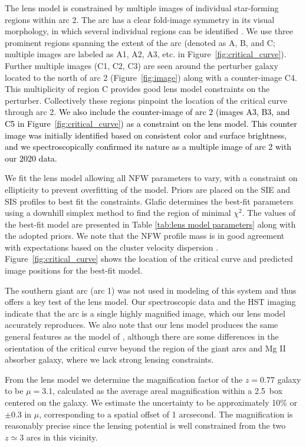 \documentclass[twocolumn]{aastex62}
\newcommand{\MgII}{Mg\tiny{ }\footnotesize{II}\normalsize{ }}
\newcommand{\comment}[1]{\textcolor{black}{#1}}
\begin{document}
The lens model is constrained by multiple images of individual star-forming regions within arc 2. The arc has a clear fold-image symmetry in its visual morphology, in which several individual regions can be identified \citep[as also discussed by][]{Dai2020}. We use three prominent regions spanning the extent of the arc (denoted as A, B, and C; multiple images are labeled as A1, A2, A3, etc. in Figure~\ref{fig:critical_curve}). Further multiple images (C1, C2, C3) are seen around the perturber galaxy located to the north of arc 2 (Figure~\ref{fig:image}) along with a counter-image C4. This multiplicity of region C provides good lens model constraints on the perturber. Collectively these regions pinpoint the location of the critical curve through arc 2. 
\comment{ We also include the counter-image of arc 2 (images A3, B3, and C5 in Figure~\ref{fig:critical_curve}) as a constraint on the lens model. This counter image was initially identified based on consistent color and surface brightness, and we spectroscopically confirmed its nature as a multiple image of arc 2 with our 2020 data. 
}

We fit the lens model allowing all NFW parameters to vary, with a constraint on ellipticity to prevent overfitting of the model. Priors are placed on the SIE and SIS profiles to best fit the constraints.  Glafic determines the best-fit parameters using a downhill simplex method to find the region of minimal $\chi^2$. The values of the best-fit model are presented in Table \ref{tab:lens model parameters} along with the adopted priors. 
We note that the NFW profile mass is in good agreement with expectations based on the cluster velocity dispersion \citep{Bayliss2011}. 
Figure~\ref{fig:critical_curve} shows the location of the critical curve and predicted image positions for the best-fit model. 


The southern giant arc (arc 1) was not used in modeling of this system and thus offers a key test of the lens model. Our spectroscopic data and the HST imaging indicate that the arc is a single highly magnified image, which our lens model accurately reproduces. We also note that our lens model produces the same general features as the model of \citet{Dai2020}, although there are some differences in the orientation of the critical curve beyond the region of the giant arcs and \MgII absorber galaxy, where we lack strong lensing constraints. 

From the lens model we determine the magnification factor of the $z=0.77$ galaxy to be $\mu=3.1$, calculated as the average areal magnification within a 2.5\arcsec~box centered on the galaxy. We estimate the uncertainty to be approximately 10\% or $\pm0.3$ in $\mu$, corresponding to a spatial offset of 1 arcsecond. 
The magnification is reasonably precise since the lensing potential is well constrained from the two $z\simeq3$ arcs in this vicinity. 
\end{document}
